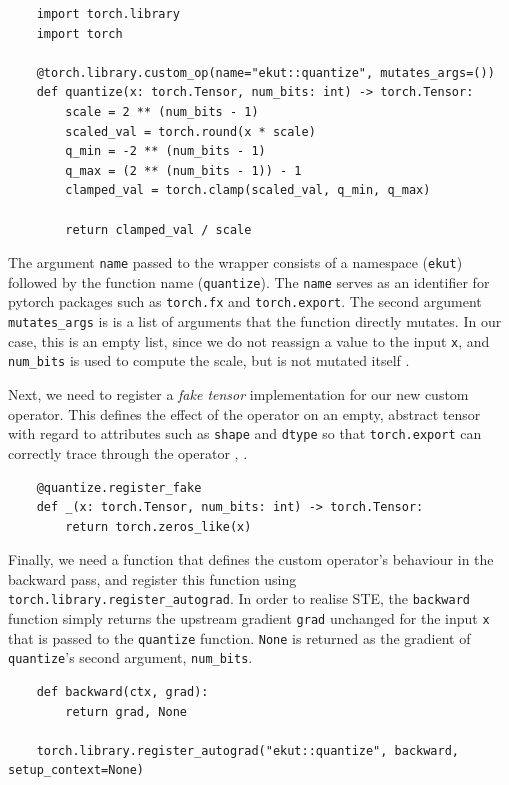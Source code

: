 \documentclass[11pt,a4paper, open=any]{scrbook}
\newcommand{\py}[1]{\texttt{#1}}
\begin{document}
\begin{verbatim}
	import torch.library
	import torch
	
	@torch.library.custom_op(name="ekut::quantize", mutates_args=())
	def quantize(x: torch.Tensor, num_bits: int) -> torch.Tensor:
		scale = 2 ** (num_bits - 1)
		scaled_val = torch.round(x * scale)
		q_min = -2 ** (num_bits - 1)
		q_max = (2 ** (num_bits - 1)) - 1
		clamped_val = torch.clamp(scaled_val, q_min, q_max)
		
		return clamped_val / scale
\end{verbatim}

The argument \py{name} passed to the wrapper consists of a namespace (\texttt{ekut}) followed by the function name (\texttt{quantize}). The \py{name} serves as an identifier for pytorch packages such as \py{torch.fx} and \py{torch.export}. The second argument \py{mutates_args} is is a list of arguments that the function directly mutates. In our case, this is an empty list, since we do not reassign a value to the input \py{x}, and \py{num_bits} is used to compute the scale, but is not mutated itself \cite{torch_custom}.

Next, we need to register a \textit{fake tensor} implementation for our new custom operator. This defines the effect of the operator on an empty, abstract tensor with regard to attributes such as \py{shape} and \py{dtype} so that \py{torch.export} can correctly trace through the operator , \cite{leimao_custom}.

\begin{verbatim}
	@quantize.register_fake
	def _(x: torch.Tensor, num_bits: int) -> torch.Tensor:
		return torch.zeros_like(x)
\end{verbatim}

Finally, we need a function that defines the custom operator's behaviour in the backward pass, and register this function using \py{torch.library.register_autograd}. In order to realise STE, the \py{backward} function simply returns the upstream gradient  \py{grad} unchanged for the input \py{x} that is passed to the \py{quantize} function. \py{None} is returned as the gradient of \py{quantize}'s second argument, \py{num_bits}.  

\begin{verbatim}
	def backward(ctx, grad):
		return grad, None
	
	torch.library.register_autograd("ekut::quantize", backward, setup_context=None)
\end{verbatim}
\end{document}
